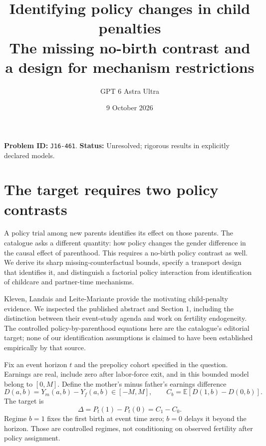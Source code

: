\documentclass[11pt]{article}
\author{GPT 6 Astra Ultra}
\date{9 October 2026}
\title{Identifying policy changes in child penalties\\\large The missing no-birth contrast and a design for mechanism restrictions}
\theoremstyle{remark}\newtheorem{remark}[theorem]{Remark}
\newcommand{\E}{\mathbb E}
\begin{document}
\maketitle
\noindent\textbf{Problem ID:} \texttt{J16-461}. \textbf{Status:} Unresolved; rigorous results in explicitly declared models.
\section{The target requires two policy contrasts}
A policy trial among new parents identifies its effect on those parents. The catalogue asks a different quantity: how policy changes the gender difference in the causal effect of parenthood. This requires a no-birth policy contrast as well. We derive its sharp missing-counterfactual bounds, specify a transport design that identifies it, and distinguish a factorial policy interaction from identification of childcare and partner-time mechanisms.

Kleven, Landais and Leite-Mariante \cite{atlas} provide the motivating child-penalty evidence. We inspected the published abstract and Section 1, including the distinction between their event-study agenda and work on fertility endogeneity. The controlled policy-by-parenthood equations here are the catalogue's editorial target; none of our identification assumptions is claimed to have been established empirically by that source.

Fix an event horizon $t$ and the prepolicy cohort specified in the question. Earnings are real, include zero after labor-force exit, and in this bounded model belong to $[0,M]$. Define the mother's minus father's earnings difference
\[
 D(a,b)=Y_m(a,b)-Y_f(a,b)\in[-M,M],\qquad
 C_b=\E[D(1,b)-D(0,b)].
\]
The target is
\[
 \Delta=P_t(1)-P_t(0)=C_1-C_0.
\]
Regime $b=1$ fixes the first birth at event time zero; $b=0$ delays it beyond the horizon. Those are controlled regimes, not conditioning on observed fertility after policy assignment.
\end{document}

